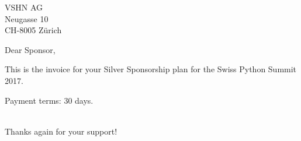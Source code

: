 \documentclass[SN,11pt,enlargefirstpage=true,sps]{scrlttr2}
\begin{document}
\begin{letter}{VSHN AG\\Neugasse 10\\CH-8005 Zürich}

  \opening{Dear Sponsor,}

  This is the invoice for your Silver Sponsorship plan for the Swiss Python Summit 2017.

  \begin{invoice}{0}%
  \end{invoice}

  Payment terms: 30 days.

  \closing{\\Thanks again for your support!}

\end{letter}
\end{document}
